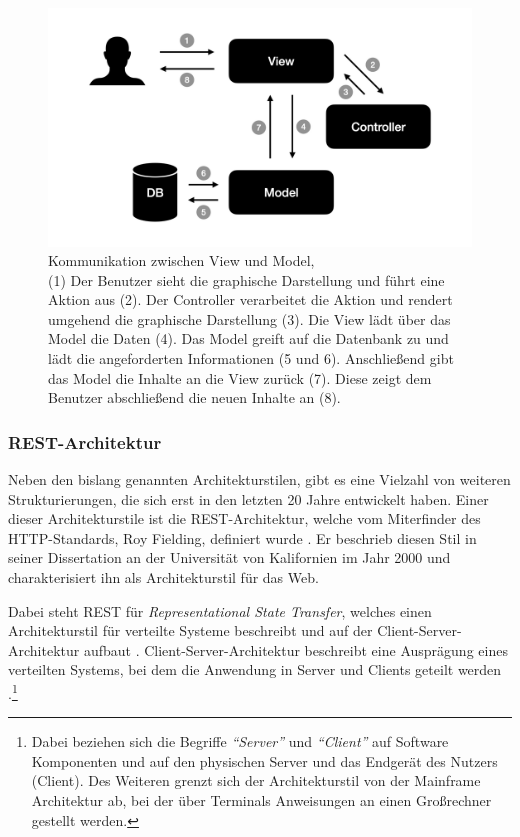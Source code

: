  \begin{figure}
 	\centering
    \includegraphics[width=.6\textwidth]{Assets/Interaktionsorientiert.002}
	\caption[Kommunikation zwischen View und Model]{Kommunikation zwischen View und Model, \\ (1) Der Benutzer sieht die graphische Darstellung und führt eine Aktion aus (2). Der Controller verarbeitet die Aktion und rendert umgehend die graphische Darstellung (3). Die View lädt über das Model die Daten (4). Das Model greift auf die Datenbank zu und lädt die angeforderten Informationen (5 und 6). Anschließend gibt das Model die Inhalte an die View zurück (7). Diese zeigt dem Benutzer abschließend die neuen Inhalte an (8).}
    \label{fig:mvc-vm-kommunikation}
 \end{figure}

\subsubsection{REST-Architektur}
\label{sec:rest}

Neben den bislang genannten Architekturstilen, gibt es eine Vielzahl von weiteren Strukturierungen, die sich erst in den letzten 20 Jahre entwickelt haben. Einer dieser Architekturstile ist die REST-Architektur, welche vom Miterfinder des HTTP-Standards, Roy Fielding, definiert wurde \parencite[][S. 128]{starke_effektive_2015}. Er beschrieb diesen Stil in seiner Dissertation an der Universität von Kalifornien im Jahr 2000 und charakterisiert ihn als Architekturstil für das Web.

Dabei steht REST für \textit{Representational State Transfer}, welches einen Architekturstil für verteilte Systeme beschreibt und auf der Client-Server-Architektur aufbaut \parencite[][S. 76]{fielding_architectural_2000}. Client-Server-Architektur beschreibt eine Ausprägung eines verteilten Systems, bei dem die Anwendung in Server und Clients geteilt werden \parencite[][S. 117]{starke_effektive_2015}.\footnote{Dabei beziehen sich die Begriffe \textit{\enquote{Server}} und \textit{\enquote{Client}} auf Software Komponenten und auf den physischen Server und das Endgerät des Nutzers (Client). Des Weiteren grenzt sich der Architekturstil von der Mainframe Architektur ab, bei der über Terminals Anweisungen an einen Großrechner gestellt werden.}

